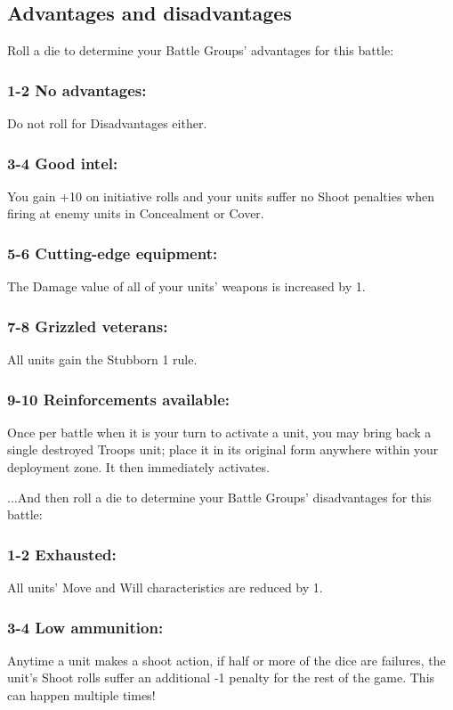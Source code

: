 \begin{multicols}{2}
\section*{Advantages and disadvantages}
Roll a die to determine your Battle Groups' advantages for this battle:
\subsubsection*{1-2 No advantages:} Do not roll for Disadvantages either.

\subsubsection*{3-4 Good intel:} You gain +10 on initiative rolls and your units suffer no Shoot penalties when firing at enemy units in Concealment or Cover.

\subsubsection*{5-6 Cutting-edge equipment:} The Damage value of all of your units' weapons is increased by 1.

\subsubsection*{7-8 Grizzled veterans:} All units gain the Stubborn 1 rule.

\subsubsection*{9-10 Reinforcements available:} Once per battle when it is your turn to activate a unit, you may bring back a single destroyed Troops unit; place it in its original form anywhere within your deployment zone. It then immediately activates.

\vspace{2em}

...And then roll a die to determine your Battle Groups' disadvantages for this battle:

\subsubsection*{1-2 Exhausted:} All units' Move and Will characteristics are reduced by 1.

\subsubsection*{3-4 Low ammunition:} Anytime a unit makes a shoot action, if half or more of the dice are failures, the unit's Shoot rolls suffer an additional -1 penalty for the rest of the game. This can happen multiple times!


\end{multicols}
